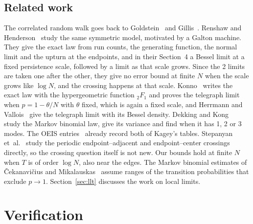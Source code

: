 \documentclass[11pt]{article}
\theoremstyle{definition}
\theoremstyle{remark}
\begin{document}
\subsection{Related work}

The correlated random walk goes back to Goldstein~\cite{goldstein1951} and
Gillis~\cite{gillis1955}. Renshaw and Henderson~\cite{renshaw1981} study the
same symmetric model, motivated by a Galton machine. They give the exact law
from run counts, the generating function, the normal limit and the upturn at
the endpoints, and in their Section~4 a Bessel limit at a fixed persistence
scale, followed by a limit as that scale grows. Since the 2 limits are taken
one after the other, they give no error bound at finite $N$ when the scale
grows like $\log N$, and the crossing happens at that scale.
Konno~\cite{konno2009} writes the exact law with the hypergeometric function
${}_2F_1$ and proves the telegraph limit when $p=1-\theta/N$ with $\theta$
fixed, which is again a fixed scale, and Herrmann and
Vallois~\cite{herrmann2010} give the telegraph limit with its Bessel density.
Dekking and Kong~\cite{dekkingkong2011} study the Markov binomial law, give its
variance and find when it has 1, 2 or 3 modes. The OEIS
entries~\cite{oeisA035002,oeisA348595} already record both of Kagey's tables.
Stepanyan et~al.\@~\cite[Section~III.B]{stepanyan2024} study the periodic
endpoint--adjacent and endpoint--center crossings directly, so the crossing
question itself is not new. Our bounds hold at finite $N$ when $T$ is of order
$\log N$, also near the edges. The Markov binomial estimates of \v{C}ekanavi\v{c}ius and
Mikalauskas~\cite{cekanavicius2001,cekanavicius2001ld} assume ranges of the
transition probabilities that exclude $p\to1$. Section~\ref{sec:llt} discusses
the work on local limits.







\section{Verification}\label{sec:verify}
\end{document}
